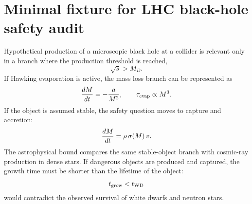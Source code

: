 \section{Minimal fixture for LHC black-hole safety audit}
Hypothetical production of a microscopic black hole at a collider is relevant
only in a branch where the production threshold is reached,
\[
  \sqrt{s} > M_D .
\]
If Hawking evaporation is active, the mass loss branch can be represented as
\[
  {dM\over dt} = - {a\over M^2}, \qquad \tau_{\rm evap} \propto M^3 .
\]
If the object is assumed stable, the safety question moves to capture and
accretion:
\[
  {dM\over dt} = \rho\,\sigma(M)\,v .
\]
The astrophysical bound compares the same stable-object branch with cosmic-ray
production in dense stars.  If dangerous objects are produced and captured, the
growth time must be shorter than the lifetime of the object:
\[
  t_{\rm grow} < t_{\rm WD}
\]
would contradict the observed survival of white dwarfs and neutron stars.
